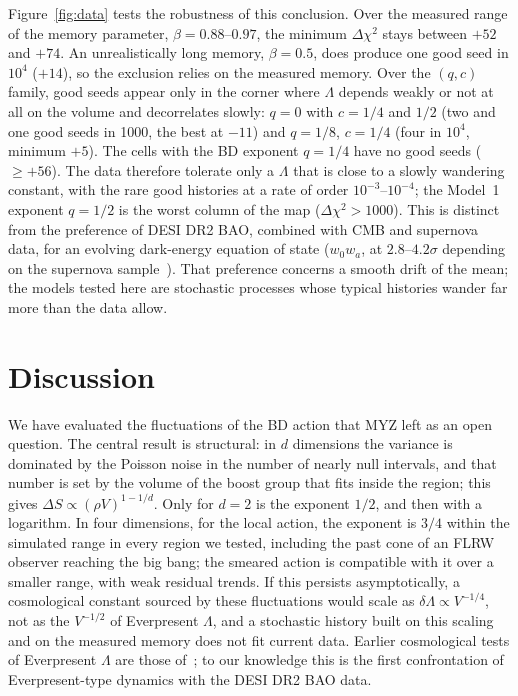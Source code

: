 \documentclass{iopjournal}
\newcommand{\Fref}[1]{Figure~\ref{#1}}
\newcommand{\rhoV}{\rho V}
\begin{document}
\Fref{fig:data} tests the robustness of this conclusion. Over the measured
range of the memory parameter, $\beta=0.88$--$0.97$, the minimum
$\Delta\chi^2$ stays between $+52$ and $+74$. An unrealistically long memory,
$\beta=0.5$, does produce one good seed in $10^4$ ($+14$), so the exclusion
relies on the measured memory. Over the $(q,c)$ family, good seeds appear only
in the corner where $\Lambda$ depends weakly or not at all on the volume and
decorrelates slowly: $q=0$ with $c=1/4$ and $1/2$ (two and one good seeds in
1000, the best at $-11$) and $q=1/8$, $c=1/4$ (four in $10^4$, minimum $+5$).
The cells with the BD exponent $q=1/4$ have no good seeds ($\geq+56$). The
data therefore tolerate only a $\Lambda$ that is close to a slowly wandering
constant, with the rare good histories at a rate of order
$10^{-3}$--$10^{-4}$; the Model~1 exponent $q=1/2$ is the worst column of the
map ($\Delta\chi^2>1000$). This is distinct from the preference of DESI DR2
BAO, combined with CMB and supernova data, for an evolving dark-energy
equation of state ($w_0w_a$, at $2.8$--$4.2\sigma$ depending on the supernova
sample~\cite{DESI2025}). That preference concerns a smooth drift of the mean;
the models tested here are stochastic processes whose typical histories
wander far more than the data allow.

\section{Discussion}
\label{sec:discussion}

We have evaluated the fluctuations of the BD action that MYZ left as an open
question. The central result is structural: in $d$ dimensions the variance is
dominated by the Poisson noise in the number of nearly null intervals, and
that number is set by the volume of the boost group that fits inside the
region; this gives $\Delta S\propto(\rhoV)^{1-1/d}$. Only for $d=2$ is the
exponent $1/2$, and then with a logarithm. In four dimensions, for the local
action, the exponent is $3/4$ within the simulated range in every region we
tested, including the past cone of an FLRW observer reaching the big bang;
the smeared action is compatible with it over a smaller range, with weak
residual trends. If this persists asymptotically, a
cosmological constant sourced by these fluctuations would scale as
$\delta\Lambda\propto V^{-1/4}$, not as the $V^{-1/2}$ of Everpresent
$\Lambda$, and a stochastic history built on this scaling and on the
measured memory does not fit current data. Earlier cosmological tests of
Everpresent $\Lambda$ are those of~\cite{Ahmed2004,Zwane2017,Das2024}; to our
knowledge this is the first confrontation of Everpresent-type dynamics with
the DESI DR2 BAO data.
\end{document}

